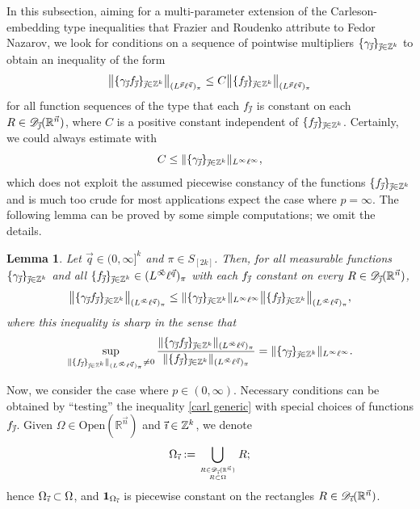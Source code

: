 \documentclass[11pt, reqno]{amsart}
\newtheorem{lemma}[theorem]{Lemma}
\theoremstyle{definition}
\theoremstyle{remark}
\numberwithin{equation}{section}
\newcommand{\D}{\mathscr D}
\newcommand{\R}{\mathbb R}
\newcommand{\Z}{\mathbb Z}
\newcommand{\vinfty}{\vec{\infty}}
\newcommand{\vi}{\vec{\textit{\i}}}
\newcommand{\vj}{\vec{\textit{\j}}}
\newcommand{\vn}{\vec n}
\newcommand{\vp}{\vec p}
\newcommand{\vq}{\vec q}
\newcommand{\one}{\mathbf{1}}
\newcommand{\Norm}[2]{\|#1\|_{#2}}
\newcommand{\bNorm}[2]{\big\|#1\big\|_{#2}}
\newcommand{\Open}{\mathrm{Open}}
\begin{document}
In this subsection, aiming for a multi-parameter extension of the Carleson-embedding type inequalities that Frazier and Roudenko \cite[Theorem 3.7]{FR21} attribute to Fedor Nazarov, we look for conditions on a sequence of pointwise multipliers $\{\gamma_{\vj}\}_{\vj\in\Z^k}$ to obtain an inequality of the form
\begin{equation}\label{carl generic}
\bNorm{\{\gamma_{\vj}f_{\vj}\}_{\vj\in\mathbb Z^k}}{(L^{\vp}\ell^{\vq})_\pi}
\leq C \bNorm{\{ f_{\vj}\}_{\vj\in\mathbb Z^k}}{(L^{\vp}\ell^{\vq})_\pi}
\end{equation}
for all function sequences of the type that each $f_{\vj}$ is constant on each $R\in\D_{\vj}(\R^{\vn})$,
where $C$ is a positive constant independent of
$\{ f_{\vj}\}_{\vj\in\mathbb Z^k}$. Certainly, we could always estimate with
\begin{equation*}
C\leq \Norm{\{\gamma_{\vj}\}_{\vj\in\mathbb Z^k}}{L^{\infty}\ell^{\infty}},
\end{equation*}
which does not exploit the assumed piecewise constancy of
the functions $\{f_{\vj}\}_{\vj\in\Z^k}$ and is much too crude for most applications
expect the case where $p=\infty$.
The following lemma can be proved by some simple computations;
we omit the details.

\begin{lemma}\label{carl small infty}
Let $\vq\in(0,\infty]^k$ and $\pi\in S_{[2k]}$.
Then, for all measurable functions $\{\gamma_{\vj}\}_{\vj\in\mathbb Z^k}$ and
all $\{ f_{\vj}\}_{\vj\in\mathbb Z^k}\in(L^{\vinfty}\ell^{\vq})_\pi$
with each $f_{\vj}$ constant on every $R\in\D_{\vj}(\R^{\vn})$,
\begin{equation*}
\bNorm{\{\gamma_{\vj}f_{\vj}\}_{\vj\in\mathbb Z^k}}{(L^{\vec\infty}\ell^{\vq})_\pi}
\le \Norm{\{\gamma_{\vj}\}_{\vj\in\mathbb Z^k}}{L^\infty \ell^\infty}
\bNorm{\{ f_{\vj}\}_{\vj\in\mathbb Z^k}}{(L^{\vec\infty}\ell^{\vq})_\pi},
\end{equation*}
where this inequality is \emph{sharp} in the sense that
$$
\sup_{\|\{ f_{\vj}\}_{\vj\in\mathbb Z^k}\|_{(L^{\vec\infty}\ell^{\vq})_\pi}\neq 0}
\frac{\|\{\gamma_{\vj}f_{\vj}\}_{\vj\in\mathbb Z^k}\|_{(L^{\vec\infty}\ell^{\vq})_\pi}}
{\|\{ f_{\vj}\}_{\vj\in\mathbb Z^k}\|_{(L^{\vec\infty}\ell^{\vq})_\pi}}
=\Norm{\{\gamma_{\vj}\}_{\vj\in\mathbb Z^k}}{L^\infty \ell^\infty}.
$$
\end{lemma}

Now, we consider the case where $p\in(0,\infty)$.
Necessary conditions can be obtained by ``testing'' the inequality \eqref{carl generic} with special choices of functions $f_{\vj}$.
Given $\Omega\in\Open(\R^{\vn})$ and $\vi\in\Z^k$, we denote
\begin{equation*}
  \Omega_{\vi}:=\bigcup_{\genfrac{}{}{0pt}{}{R\in\mathscr D_{\vi}(\R^{\vn})}{R\subset\Omega}}R;
\end{equation*}
hence $\Omega_{\vi}\subset\Omega$, and $\one_{\Omega_{\vi}}$ is piecewise constant on the rectangles $R\in\mathscr D_{\vi}(\R^{\vn})$.
\end{document}
